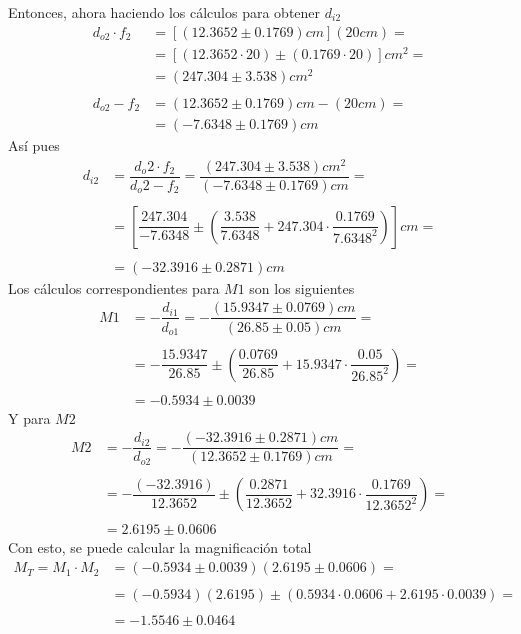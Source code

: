 \documentclass[10pt,a4paper]{article}
\begin{document}
Entonces, ahora haciendo los cálculos para obtener $d_{i2}$
\begin{align*}
	d_{o2}\cdot f_2&=[(12.3652\pm0.1769)cm](20cm)=\\
	&=\left[(12.3652\cdot20)\pm\left(0.1769\cdot20\right)\right]cm^2=\\
	&=(247.304\pm3.538)cm^2\\\\
	d_{o2}-f_2&=(12.3652\pm0.1769)cm-(20cm)=\\
	&=(-7.6348\pm0.1769)cm
\end{align*}
Así pues 
\begin{align*}
	d_{i2}&=\dfrac{d_o2\cdot f_2}{d_o2-f_2}=\dfrac{(247.304\pm3.538)cm^2}{(-7.6348\pm0.1769)cm}=\\\\
	&=\left[\dfrac{247.304}{-7.6348}\pm\left(\dfrac{3.538}{7.6348}+247.304\cdot\dfrac{0.1769}{7.6348^2}\right)\right]cm=\\\\
	&=(-32.3916\pm 0.2871)cm
\end{align*}
Los cálculos correspondientes para $M1$ son los siguientes
\begin{align*}
	M1&=-\dfrac{d_{i1}}{d_{o1}}=-\dfrac{(15.9347\pm0.0769)cm}{(26.85\pm 0.05) cm}=\\\\
	&=-\dfrac{15.9347}{26.85}\pm\left(\dfrac{0.0769}{26.85}+15.9347\cdot\dfrac{0.05}{26.85^2}\right)=\\\\
	&=-0.5934\pm0.0039 
\end{align*}
Y para $M2$
\begin{align*}
	M2&=-\dfrac{d_{i2}}{d_{o2}}=-\dfrac{(-32.3916\pm 0.2871) cm}{(12.3652\pm0.1769)cm}=\\\\
	&=-\dfrac{(-32.3916)}{12.3652}\pm\left(\dfrac{0.2871}{12.3652}+32.3916\cdot\dfrac{0.1769}{12.3652^2}\right)=\\\\
	&=2.6195\pm0.0606
\end{align*}
Con esto, se puede calcular la magnificación total
\begin{align*}
	M_T=M_1\cdot M_2&=(-0.5934\pm0.0039)(2.6195\pm0.0606)=\\\\
	&=(-0.5934)(2.6195)\pm\left(0.5934\cdot0.0606+2.6195\cdot0.0039\right)=\\\\
	&=-1.5546\pm0.0464 
\end{align*}
\end{document}
